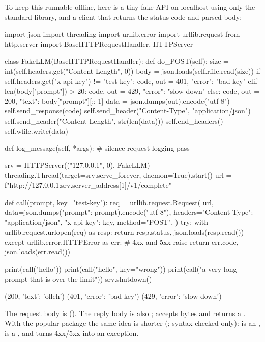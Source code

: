 To keep this runnable offline, here is a tiny fake API on localhost using only the
standard library, and a client that returns the status code and parsed body:

\begin{pycode}
import json
import threading
import urllib.error
import urllib.request
from http.server import BaseHTTPRequestHandler, HTTPServer

class FakeLLM(BaseHTTPRequestHandler):
    def do_POST(self):
        size = int(self.headers.get("Content-Length", 0))
        body = json.loads(self.rfile.read(size))
        if self.headers.get("x-api-key") != "test-key":
            code, out = 401, {"error": "bad key"}
        elif len(body["prompt"]) > 20:
            code, out = 429, {"error": "slow down"}
        else:
            code, out = 200, {"text": body["prompt"][::-1]}
        data = json.dumps(out).encode("utf-8")
        self.send_response(code)
        self.send_header("Content-Type", "application/json")
        self.send_header("Content-Length", str(len(data)))
        self.end_headers()
        self.wfile.write(data)

    def log_message(self, *args):          # silence request logging
        pass

srv = HTTPServer(("127.0.0.1", 0), FakeLLM)
threading.Thread(target=srv.serve_forever, daemon=True).start()
url = f"http://127.0.0.1:{srv.server_address[1]}/v1/complete"

def call(prompt, key="test-key"):
    req = urllib.request.Request(
        url,
        data=json.dumps({"prompt": prompt}).encode("utf-8"),
        headers={"Content-Type": "application/json", "x-api-key": key},
        method="POST",
    )
    try:
        with urllib.request.urlopen(req) as resp:
            return resp.status, json.loads(resp.read())
    except urllib.error.HTTPError as err:   # 4xx and 5xx raise
        return err.code, json.loads(err.read())

print(call("hello"))
print(call("hello", key="wrong"))
print(call("a very long prompt that is over the limit"))
srv.shutdown()
\end{pycode}
\begin{rawcode}
(200, {'text': 'olleh'})
(401, {'error': 'bad key'})
(429, {'error': 'slow down'})
\end{rawcode}

\begin{typecheck}
The request body is  (). The reply
body is also ;  accepts bytes and returns a . With
the popular  package the same idea is shorter (;
syntax-checked only):  is an ,  is a
, and  turns 4xx/5xx into an exception.
\end{typecheck}

